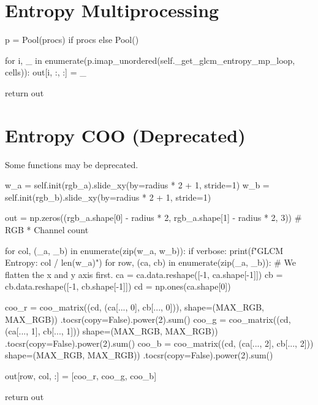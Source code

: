 \documentclass[article,oneside]{memoir}
\begin{document}
\section{Entropy Multiprocessing}

\begin{python}
p = Pool(procs) if procs else Pool()

for i, _ in enumerate(p.imap_unordered(self._get_glcm_entropy_mp_loop, cells)):
    out[i, :, :] = _

return out
\end{python}

\section{Entropy COO (Deprecated)}

Some functions may be deprecated.

\begin{python}
w_a = self.init(rgb_a).slide_xy(by=radius * 2 + 1, stride=1)
w_b = self.init(rgb_b).slide_xy(by=radius * 2 + 1, stride=1)

out = np.zeros((rgb_a.shape[0] - radius * 2,
                rgb_a.shape[1] - radius * 2,
                3))  # RGB * Channel count

for col, (_a, _b) in enumerate(zip(w_a, w_b)):
    if verbose: print(f"GLCM Entropy: {col} / {len(w_a)}")
    for row, (ca, cb) in enumerate(zip(_a, _b)):
        # We flatten the x and y axis first.
        ca = ca.data.reshape([-1, ca.shape[-1]])
        cb = cb.data.reshape([-1, cb.shape[-1]])
        cd = np.ones(ca.shape[0])

        coo_r = coo_matrix((cd, (ca[..., 0], cb[..., 0])),
                            shape=(MAX_RGB, MAX_RGB))
                            .tocsr(copy=False).power(2).sum()
        coo_g = coo_matrix((cd, (ca[..., 1], cb[..., 1]))
                            shape=(MAX_RGB, MAX_RGB))
                            .tocsr(copy=False).power(2).sum()
        coo_b = coo_matrix((cd, (ca[..., 2], cb[..., 2]))
                            shape=(MAX_RGB, MAX_RGB))
                            .tocsr(copy=False).power(2).sum()

        out[row, col, :] = [coo_r, coo_g, coo_b]

return out
\end{python}
\end{document}
